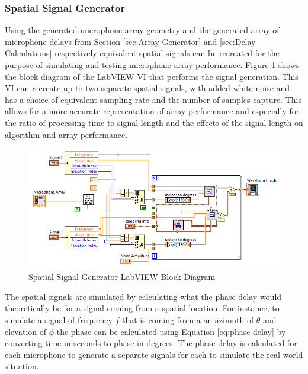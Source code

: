 \documentclass{UoNMCHA}
\numberwithin{equation}{section}
\begin{document}
\subsubsection{Spatial Signal Generator} \label{sec:Signal Generator}
    Using the generated microphone array geometry and the generated array of microphone delays from Section \ref{sec:Array Generator} and \ref{sec:Delay Calculations} respectively equivalent spatial signals can be recreated for the purpose of simulating and testing microphone array performance. Figure \ref{fig:SignalGenBlock} shows the block diagram of the LabVIEW VI that performs the signal generation. This VI can recreate up to two separate spatial signals, with added white noise and has a choice of equivalent sampling rate and the number of samples capture. This allows for a more accurate representation of array performance and especially for the ratio of processing time to signal length and the effects of the signal length on algorithm and array performance. 
    
    \begin{figure}[H]
        \centering
        \includegraphics[keepaspectratio, width = \textwidth]{Figures/SignalGenBlock.png}
        \caption{Spatial Signal Generator LabVIEW Block Diagram}
        \label{fig:SignalGenBlock}
    \end{figure}    
    
    The spatial signals are simulated by calculating what the phase delay would theoretically be for a signal coming from a spatial location. For instance, to simulate a signal of frequency $f$ that is coming from a an azimuth of $\theta$ and elevation of $\phi$ the phase can be calculated using Equation \ref{eq:phase delay} by converting time in seconds to phase in degrees. The phase delay is calculated for each microphone to generate a separate signals for each to simulate the real world situation.
    
\end{document}
